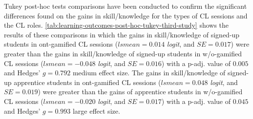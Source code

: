 Tukey post-hoc tests comparisons have been conducted to confirm the significant differences found on the gains in skill/knowledge for the types of CL sessions and the CL roles. \autoref{tab:learning-outcomes-post-hoc-tukey-third-study} shows the results of these comparisons in which 
the gains in skill/knowledge of signed-up students in ont-gamified CL sessions ($lsmean=0.014$ \emph{logit}, and $SE = 0.017$) were greater than the gains in skill/knowledge of signed-up students in w/o-gamified CL sessions ($lsmean=-0.048$ \emph{logit}, and $SE = 0.016$) with a p-adj. value of $0.005$ and Hedges' $g=0.792$ medium effect size.
The gains in skill/knowledge of signed-up apprentice students in ont-gamified CL sessions ($lsmean=0.048$ \emph{logit}, and $SE = 0.019$) were greater than the gains of apprentice students in w/o-gamified CL sessions ($lsmean=-0.020$ \emph{logit}, and $SE = 0.017$) with a p-adj. value of $0.045$ and Hedges' $g=0.993$ large effect size.


